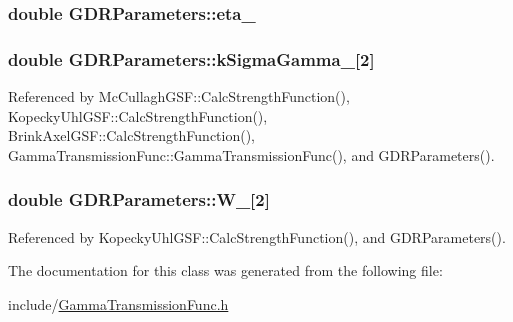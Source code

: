 \hypertarget{classGDRParameters_ad934d0d1a4a3ad93326f9af97eeb9d7c}{
\subsubsection[{eta\-\_\-}]{\setlength{\rightskip}{0pt plus 5cm}double G\-D\-R\-Parameters\-::eta\-\_\-}}\label{classGDRParameters_ad934d0d1a4a3ad93326f9af97eeb9d7c}
\hypertarget{classGDRParameters_afd7899667da29eab4842a6e1389b3386}{
\subsubsection[{k\-Sigma\-Gamma\-\_\-}]{\setlength{\rightskip}{0pt plus 5cm}double G\-D\-R\-Parameters\-::k\-Sigma\-Gamma\-\_\-\mbox{[}2\mbox{]}}}\label{classGDRParameters_afd7899667da29eab4842a6e1389b3386}


Referenced by Mc\-Cullagh\-G\-S\-F\-::\-Calc\-Strength\-Function(), Kopecky\-Uhl\-G\-S\-F\-::\-Calc\-Strength\-Function(), Brink\-Axel\-G\-S\-F\-::\-Calc\-Strength\-Function(), Gamma\-Transmission\-Func\-::\-Gamma\-Transmission\-Func(), and G\-D\-R\-Parameters().

\hypertarget{classGDRParameters_ab907ef31caef7af38a2ed6bc8a45e365}{
\subsubsection[{W\-\_\-}]{\setlength{\rightskip}{0pt plus 5cm}double G\-D\-R\-Parameters\-::\-W\-\_\-\mbox{[}2\mbox{]}}}\label{classGDRParameters_ab907ef31caef7af38a2ed6bc8a45e365}


Referenced by Kopecky\-Uhl\-G\-S\-F\-::\-Calc\-Strength\-Function(), and G\-D\-R\-Parameters().



The documentation for this class was generated from the following file\-:\begin{DoxyCompactItemize}
\item 
include/\hyperlink{GammaTransmissionFunc_8h}{Gamma\-Transmission\-Func.\-h}\end{DoxyCompactItemize}

